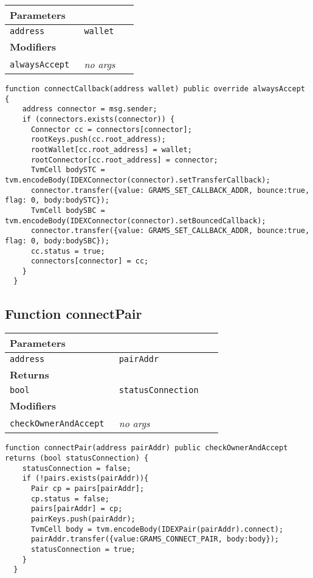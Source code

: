 \ifsoltables
\noindent\begin{tabular}{|l|l|p{5cm}|}\hline
\multicolumn{3}{|l|}{\bf Parameters}\\\hline
\tt address & \tt wallet &\\\hline
\multicolumn{3}{|l|}{\bf Modifiers}\\\hline
\tt alwaysAccept & {\em no args} &\\\hline
\end{tabular}
\fi

\vspace{2cm}

\begin{lstlisting}[firstnumber=181]
  function connectCallback(address wallet) public override alwaysAccept {
    address connector = msg.sender;
    if (connectors.exists(connector)) {
      Connector cc = connectors[connector];
      rootKeys.push(cc.root_address);
      rootWallet[cc.root_address] = wallet;
      rootConnector[cc.root_address] = connector;
      TvmCell bodySTC = tvm.encodeBody(IDEXConnector(connector).setTransferCallback);
      connector.transfer({value: GRAMS_SET_CALLBACK_ADDR, bounce:true, flag: 0, body:bodySTC});
      TvmCell bodySBC = tvm.encodeBody(IDEXConnector(connector).setBouncedCallback);
      connector.transfer({value: GRAMS_SET_CALLBACK_ADDR, bounce:true, flag: 0, body:bodySBC});
      cc.status = true;
      connectors[connector] = cc;
    }
  }
\end{lstlisting}

\subsection{Function connectPair}


\ifsoltables
\noindent\begin{tabular}{|l|l|p{5cm}|}\hline
\multicolumn{3}{|l|}{\bf Parameters}\\\hline
\tt address & \tt pairAddr &\\\hline
\multicolumn{3}{|l|}{\bf Returns}\\\hline
\tt bool & \tt statusConnection &\\\hline
\multicolumn{3}{|l|}{\bf Modifiers}\\\hline
\tt checkOwnerAndAccept & {\em no args} &\\\hline
\end{tabular}
\fi

\vspace{2cm}

\begin{lstlisting}[firstnumber=92]
  function connectPair(address pairAddr) public checkOwnerAndAccept  returns (bool statusConnection) {
    statusConnection = false;
    if (!pairs.exists(pairAddr)){
      Pair cp = pairs[pairAddr];
      cp.status = false;
      pairs[pairAddr] = cp;
      pairKeys.push(pairAddr);
      TvmCell body = tvm.encodeBody(IDEXPair(pairAddr).connect);
      pairAddr.transfer({value:GRAMS_CONNECT_PAIR, body:body});
      statusConnection = true;
    }
  }
\end{lstlisting}

